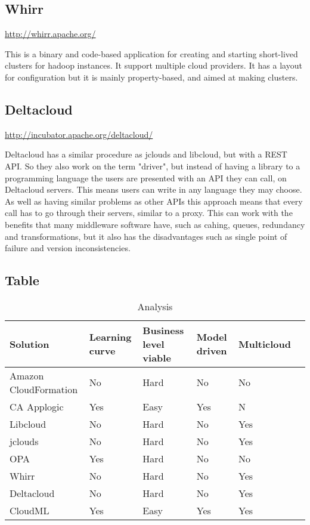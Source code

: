 \subsection{Whirr}
\url{http://whirr.apache.org/}

This is a binary and code-based application for creating and starting short-lived clusters for hadoop instances.
It support multiple cloud providers. It has a layout for configuration but it is mainly property-based, and aimed at making clusters. 

\subsection{Deltacloud}
\url{http://incubator.apache.org/deltacloud/}

Deltacloud has a similar procedure as jclouds and libcloud, but with a REST API. 
So they also work on the term "driver", but instead of having a library to a programming language the users are presented with an API they can call, 
on Deltacloud servers. This means users can write in any language they may choose. 
As well as having similar problems as other APIs this approach means that every call has to go through their servers, 
similar to a proxy. This can work with the benefits that many middleware software have, such as cahing, queues, 
redundancy and transformations, but it also has the disadvantages such as single point of failure and version inconsistencies.

\subsection{Table}
\begin{table}
    \caption{Analysis}
    \begin{tabular}{ | p{2cm} | p{2cm} | p{2.5cm} | p{2cm} | p{2cm} | p{2cm} |}
      \hline
      \textbf{Solution} & \textbf{Learning curve} & \textbf{Business level viable} & \textbf{Model driven} & \textbf{Multicloud} \\
      \hline
     Amazon CloudFormation & No & Hard & No & No \\ \hline
     CA Applogic & Yes & Easy & Yes & N  \\ \hline
     Libcloud & No & Hard & No & Yes \\ \hline
     jclouds & No & Hard & No & Yes \\ \hline
     OPA & Yes & Hard & No & No \\ \hline
     Whirr & No & Hard & No & Yes \\ \hline
     Deltacloud & No & Hard & No & Yes \\ \hline
     CloudML & Yes & Easy & Yes & Yes \\ \hline
    \end{tabular}
\end{table}

